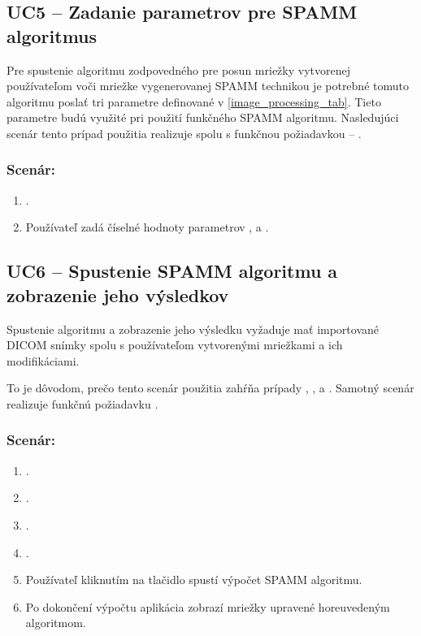 \subsection {UC5 -- Zadanie parametrov pre SPAMM algoritmus}\label{uc5}
Pre spustenie algoritmu zodpovedného pre posun mriežky vytvorenej používateľom voči mriežke vygenerovanej SPAMM technikou je potrebné tomuto algoritmu poslať tri parametre definované v \ref{image_processing_tab}. Tieto parametre budú využité pri použití funkčného SPAMM algoritmu. Nasledujúci scenár tento prípad použitia realizuje spolu s funkčnou požiadavkou -- .

\clearpage

\subsubsection*{Scenár:}
\begin {enumerate}
\item {.}
\item {Používateľ zadá číselné hodnoty parametrov , \newline {} a .}
\end {enumerate}

\subsection {UC6 -- Spustenie SPAMM algoritmu a zobrazenie jeho výsledkov}\label{uc6}
Spustenie algoritmu a zobrazenie jeho výsledku vyžaduje mať importované DICOM snímky spolu s používateľom vytvorenými mriežkami a ich modifikáciami.

To je dôvodom, prečo tento scenár použitia zahŕňa prípady , ,  a . Samotný scenár realizuje funkčnú požiadavku .

\subsubsection*{Scenár:}
\begin {enumerate}
\item {}.
\item {}.
\item {}.
\item {}.
\item {Používateľ kliknutím na tlačidlo  spustí výpočet SPAMM algoritmu.}
\item {Po dokončení výpočtu aplikácia zobrazí mriežky upravené horeuvedeným algoritmom.}
\end {enumerate}

